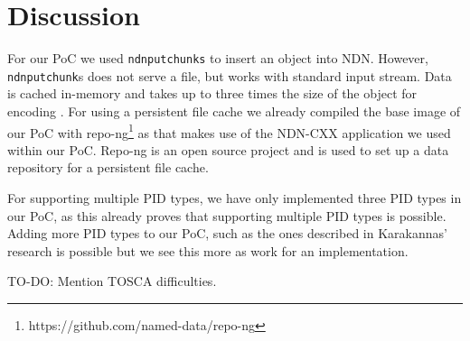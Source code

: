 \section{Discussion}\label{disc}



For our PoC we used \texttt{ndnputchunks} to insert an object into NDN. However, \texttt{ndnputchunk}s does not serve a file, but works with standard input stream. Data is cached in-memory and takes up to three times the size of the object for encoding \cite{ndnput-mem}. For using a persistent file cache we already compiled the base image of our PoC with repo-ng\footnote{https://github.com/named-data/repo-ng} as that makes use
of the NDN-CXX application we used within our PoC. Repo-ng is an open source project and is used to set up a data repository for a persistent file cache.

For supporting multiple PID types, we have only implemented three PID types in our PoC, as this already proves that supporting multiple PID types is possible. Adding more PID types to our PoC, such as the ones described in Karakannas' research \cite{icn-bd} is possible but we see this more as work for an implementation.

TO-DO: Mention TOSCA difficulties.